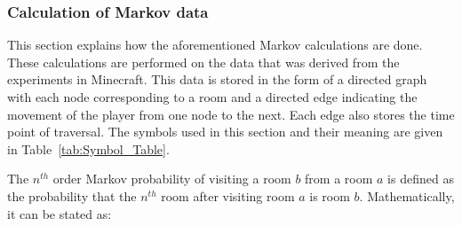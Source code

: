 


\subsubsection{Calculation of Markov data} %
\label{sec:calculation_of_Markov_data}


This section explains how the aforementioned Markov calculations are done. These calculations are performed on the data that was derived from the experiments in Minecraft. This data is stored in the form of a directed graph with each node corresponding to a room and a directed edge indicating the movement of the player from one node to the next. Each edge also stores the time point of traversal. The symbols used in this section and their meaning are given in Table~\ref{tab:Symbol_Table}.


The $n^{th}$ order Markov probability of visiting a room $b$ from a room $a$ is defined as the probability that the $n^{th}$ room after visiting room $a$ is room $b$. Mathematically, it can be stated as:

